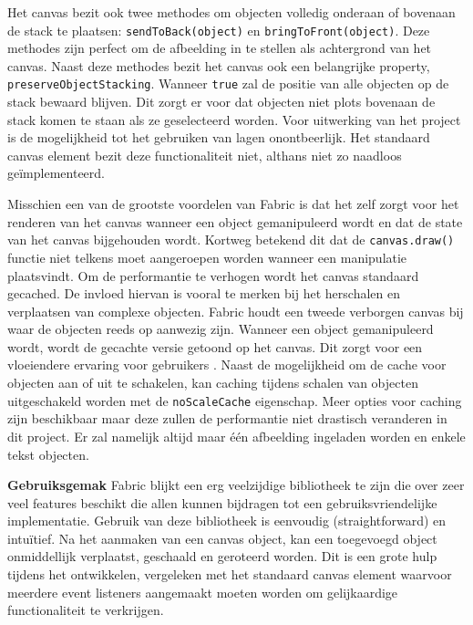 Het canvas bezit ook twee methodes om objecten volledig onderaan of bovenaan de stack te plaatsen: \texttt{sendToBack(object)} en \texttt{bringToFront(object)}. Deze methodes zijn perfect om de afbeelding in te stellen als achtergrond van het canvas. Naast deze methodes bezit het canvas ook een belangrijke property, \texttt{preserveObjectStacking}. Wanneer \texttt{true} zal de positie van alle objecten op de stack bewaard blijven. Dit zorgt er voor dat objecten niet plots bovenaan de stack komen te staan als ze geselecteerd worden. Voor uitwerking van het project is de mogelijkheid tot het gebruiken van lagen onontbeerlijk. Het standaard canvas element bezit deze functionaliteit niet, althans niet zo naadloos ge\"{i}mplementeerd. 

Misschien een van de grootste voordelen van Fabric is dat het zelf zorgt voor het renderen van het canvas wanneer een object gemanipuleerd wordt en dat de state van het canvas bijgehouden wordt. Kortweg betekend dit dat de \texttt{canvas.draw()} functie niet telkens moet aangeroepen worden wanneer een manipulatie plaatsvindt. Om de performantie te verhogen wordt het canvas standaard gecached. De invloed hiervan is vooral te merken bij het herschalen en verplaatsen van complexe objecten. %
Fabric houdt een tweede verborgen canvas bij waar de objecten reeds op aanwezig zijn. Wanneer een object gemanipuleerd wordt, wordt de gecachte versie getoond op het canvas. Dit zorgt voor een vloeiendere ervaring voor gebruikers \cite{FabricJSCaching}. Naast de mogelijkheid om de cache voor objecten aan of uit te schakelen, kan caching tijdens schalen van objecten uitgeschakeld worden met de \texttt{noScaleCache} eigenschap. Meer opties voor caching zijn beschikbaar maar deze zullen de performantie niet drastisch veranderen in dit project. Er zal namelijk altijd maar \'{e}\'{e}n afbeelding ingeladen worden en enkele tekst objecten. %

\textbf{Gebruiksgemak} \break
Fabric blijkt een erg veelzijdige bibliotheek te zijn die over zeer veel features beschikt die allen kunnen bijdragen tot een gebruiksvriendelijke implementatie. Gebruik van deze bibliotheek is eenvoudig (straightforward) en intu\"{i}tief. Na het aanmaken van een canvas object, kan een toegevoegd object onmiddellijk verplaatst, geschaald en geroteerd worden. Dit is een grote hulp tijdens het ontwikkelen, vergeleken met het standaard canvas element waarvoor meerdere event listeners aangemaakt moeten worden om gelijkaardige functionaliteit te verkrijgen. 

